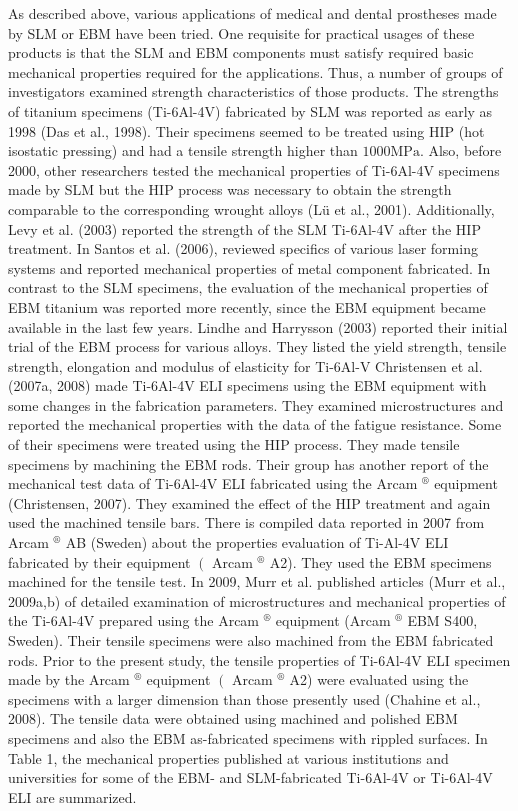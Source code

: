 \documentclass[10pt]{article}
\begin{document}
As described above, various applications of medical and dental prostheses made by SLM or EBM have been tried. One requisite for practical usages of these products is that the SLM and EBM components must satisfy required basic mechanical properties required for the applications. Thus, a number of groups of investigators examined strength characteristics of those products. The strengths of titanium specimens (Ti-6Al-4V) fabricated by SLM was reported as early as 1998 (Das et al., 1998). Their specimens seemed to be treated using HIP (hot isostatic pressing) and had a tensile strength higher than $1000 \mathrm{MPa}$. Also, before 2000, other researchers tested the mechanical properties of Ti-6Al-4V specimens made by SLM but the HIP process was necessary to obtain the strength comparable to the corresponding wrought alloys (Lü et al., 2001). Additionally, Levy et al. (2003) reported the strength of the SLM Ti-6Al-4V after the HIP treatment. In Santos et al. (2006), reviewed specifics of various laser forming systems and reported mechanical properties of metal component fabricated. In contrast to the SLM specimens, the evaluation of the mechanical properties of EBM titanium was reported more recently, since the EBM equipment became available in the last few years. Lindhe and Harrysson (2003) reported their initial trial of the EBM process for various alloys. They listed the yield strength, tensile strength, elongation and modulus of elasticity for Ti-6Al-V Christensen et al. (2007a, 2008) made Ti-6Al-4V ELI specimens using the EBM equipment with some changes in the fabrication parameters. They examined microstructures and reported the mechanical properties with the data of the fatigue resistance. Some of their specimens were treated using the HIP process. They made tensile specimens by machining the EBM rods. Their group has another report of the mechanical test data of Ti-6Al-4V ELI fabricated using the Arcam ${ }^{\circledR}$ equipment (Christensen, 2007). They examined the effect of the HIP treatment and again used the machined tensile bars. There is compiled data reported in 2007 from Arcam $^{\circledR}$ AB (Sweden) about the properties evaluation of Ti-Al-4V ELI fabricated by their equipment $\left(\right.$ Arcam ${ }^{\circledR}$ A2). They used the EBM specimens machined for the tensile test. In 2009, Murr et al. published articles (Murr et al., 2009a,b) of detailed examination of microstructures and mechanical properties of the Ti-6Al-4V prepared using the Arcam $^{\circledR}$ equipment (Arcam ${ }^{\circledR}$ EBM S400, Sweden). Their tensile specimens were also machined from the EBM fabricated rods. Prior to the present study, the tensile properties of Ti-6Al-4V ELI specimen made by the Arcam $^{\circledR}$ equipment $\left(\right.$ Arcam $^{\circledR}$ A2) were evaluated using the specimens with a larger dimension than those presently used (Chahine et al., 2008). The tensile data were obtained using machined and polished EBM specimens and also the EBM as-fabricated specimens with rippled surfaces. In Table 1, the mechanical properties published at various institutions and universities for some of the EBM- and SLM-fabricated Ti-6Al-4V or Ti-6Al-4V ELI are summarized.
\end{document}

